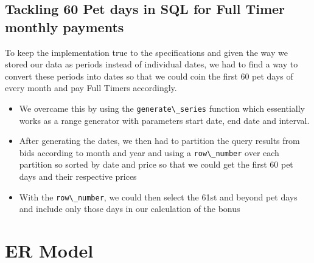 \documentclass[
  paper=a4,
  ,captions=tableheading
]{scrartcl}
\newcommand{\passthrough}[1]{#1}
\providecommand{\tightlist}{%
  \setlength{\itemsep}{0pt}\setlength{\parskip}{0pt}}
\begin{document}
\hypertarget{tackling-60-pet-days-in-sql-for-full-timer-monthly-payments}{%
\subsection{Tackling 60 Pet days in SQL for Full Timer monthly
payments}\label{tackling-60-pet-days-in-sql-for-full-timer-monthly-payments}}

To keep the implementation true to the specifications and given the way
we stored our data as periods instead of individual dates, we had to
find a way to convert these periods into dates so that we could coin the
first 60 pet days of every month and pay Full Timers accordingly.

\begin{itemize}
\tightlist
\item
  We overcame this by using the
  \passthrough{\lstinline!generate\_series!} function which essentially
  works as a range generator with parameters start date, end date and
  interval.
\item
  After generating the dates, we then had to partition the query results
  from bids according to month and year and using a
  \passthrough{\lstinline!row\_number!} over each partition so sorted by
  date and price so that we could get the first 60 pet days and their
  respective prices
\item
  With the \passthrough{\lstinline!row\_number!}, we could then select
  the 61st and beyond pet days and include only those days in our
  calculation of the bonus
\end{itemize}

\hypertarget{er-model}{%
\section{ER Model}\label{er-model}}
\end{document}
